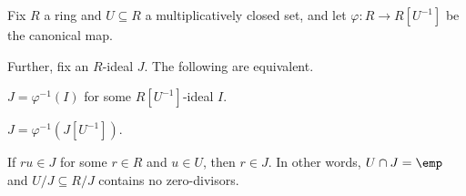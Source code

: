 \begin{lemma} \label{lem:localidealsb}
	Fix $R$ a ring and $U\subseteq R$ a multiplicatively closed set, and let $\varphi:R\to R\left[U^{-1}\right]$ be the canonical map.
	
	Further, fix an $R$-ideal $J$. The following are equivalent.
	\begin{listroman}
		\item $J=\varphi^{-1}(I)$ for some $R\left[U^{-1}\right]$-ideal $I$.
		\item $J=\varphi^{-1}\left(J\left[U^{-1}\right]\right)$.
		\item If $ru\in J$ for some $r\in R$ and $u\in U$, then $r\in J$. In other words, $U\cap J=\emp$ and $U/J\subseteq R/J$ contains no zero-divisors.
	\end{listroman}
\end{lemma}
